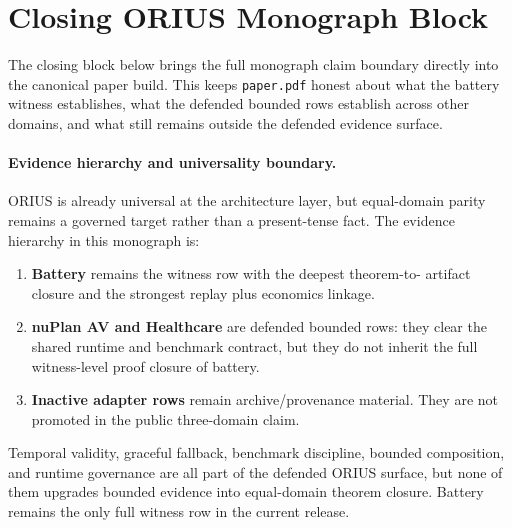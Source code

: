 \section{Closing ORIUS Monograph Block}\label{sec:closing_longform}

The closing block below brings the full monograph claim boundary directly into
the canonical paper build. This keeps \texttt{paper.pdf} honest about what the
battery witness establishes, what the defended bounded rows establish across
other domains, and what still remains outside the defended evidence surface.

\paragraph{Evidence hierarchy and universality boundary.}
ORIUS is already universal at the architecture layer, but equal-domain parity
remains a governed target rather than a present-tense fact.  The evidence
hierarchy in this monograph is:
\begin{enumerate}[leftmargin=*,topsep=2pt,itemsep=1pt]
  \item \textbf{Battery} remains the witness row with the deepest theorem-to-
        artifact closure and the strongest replay plus economics linkage.
  \item \textbf{nuPlan AV and Healthcare} are defended bounded rows: they clear
        the shared runtime and benchmark contract, but they do not inherit the
        full witness-level proof closure of battery.
  \item \textbf{Inactive adapter rows} remain archive/provenance material.  They
        are not promoted in the public three-domain claim.
\end{enumerate}
Temporal validity, graceful fallback, benchmark discipline, bounded
composition, and runtime governance are all part of the defended ORIUS
surface, but none of them upgrades bounded evidence into equal-domain theorem
closure.  Battery remains the only full witness row in the current release.

